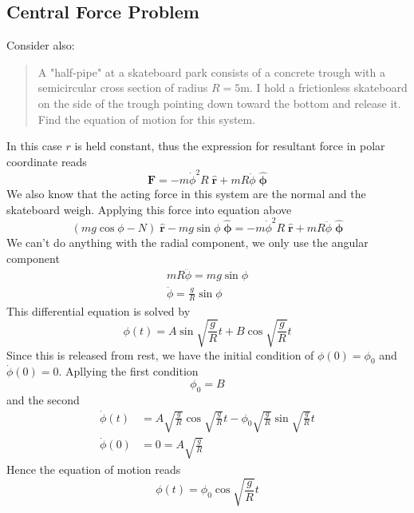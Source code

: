 \documentclass[../../../main.tex]{subfiles}
\begin{document}
\subsection{Central Force Problem}
Consider also:
\begin{quotation}
    A "half-pipe" at a skateboard park consists of a concrete trough with a semicircular cross section of radius $R = 5 $m. I hold a frictionless skateboard on the side of the trough pointing down toward the bottom and release it. Find the equation of motion for this system.
\end{quotation}

\begin{figure*}[h]
    \centering
\end{figure*}

In this case $r$ is held constant, thus the expression for resultant force in polar coordinate reads
\begin{equation*}
    \mathbf{F}=-m\dot{\phi}^2R\;\mathbf{\hat{r}}+ mR\ddot{\phi} \;\boldsymbol{ \hat{\phi}}
\end{equation*}
We also know that the acting force in this system are the normal and the skateboard weigh. Applying this force into equation above
\begin{equation*}
    \left(mg\cos\phi-N\right) \;\mathbf{\hat{r}}-mg\sin\phi\; \boldsymbol{ \hat{\phi}}=-m\dot{\phi}^2R\;\mathbf{\hat{r}}+ mR\ddot{\phi} \;\boldsymbol{ \hat{\phi}}
\end{equation*}
We can't do anything with the radial component, we only use the angular component
\begin{align*}
    mR\ddot{\phi} = mg\sin\phi \\
    \ddot{\phi} = {\frac{g}{R}} \sin\phi
\end{align*}
This differential equation is solved by 
\begin{equation*}
    \phi(t)=A\sin \sqrt{\frac{g}{R}}t +B\cos \sqrt{\frac{g}{R}}t
\end{equation*}
Since this is released from rest, we have the initial condition of $\phi(0)=\phi_0$ and $\dot{\phi}(0)=0$. Apllying the first condition
\begin{equation*}
    \phi_0=B
\end{equation*}
and the second
\begin{align*}
    \dot{\phi}(t)&=A\sqrt{\frac{g}{R}} \cos \sqrt{\frac{g}{R}}t -\phi_0\sqrt{\frac{g}{R}}\sin \sqrt{\frac{g}{R}}t\\
    \dot{\phi}(0)&=0=A\sqrt{\frac{g}{R}}
\end{align*}
Hence the equation of motion reads
\begin{equation*}
    \phi(t)=\phi_0\cos \sqrt{\frac{g}{R}}t
\end{equation*}
\end{document}
